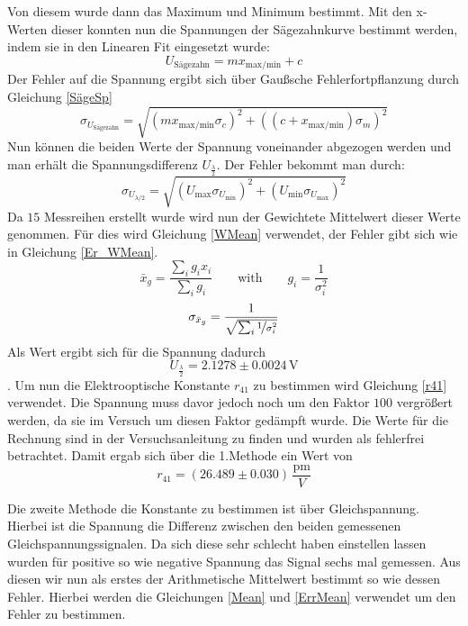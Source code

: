 Von diesem wurde dann das Maximum und Minimum bestimmt. Mit den x-Werten dieser konnten nun die Spannungen der Sägezahnkurve bestimmt werden, indem sie in den Linearen Fit eingesetzt wurde:
\begin{equation}
	U_\text{Sägezahn}= mx_{\text{max/min}} + c
\end{equation}
Der Fehler auf die Spannung ergibt sich über Gaußsche Fehlerfortpflanzung durch Gleichung \ref{SägeSp}
\begin{equation}
	\sigma_{U_\text{Sägezahn}}=\sqrt{\left(mx_{\text{max/min}}\sigma_c\right)^2+\left((c + x_{\text{max/min}})\sigma_m\right)^2}
	\label{SägeSp}
\end{equation}
Nun können die beiden Werte der Spannung voneinander abgezogen werden und man erhält die Spannungsdifferenz $U_{\frac{\lambda}{2}}$. Der Fehler bekommt man durch:
\begin{equation}
	\sigma_{U_{\lambda/2}}=\sqrt{\left(U_\text{max}\sigma_{U_{\text{min}}}\right)^2+\left(U_{\text{min}}\sigma_{U_{\text{max}}}\right)^2}
	\label{Errdif}
\end{equation}
Da $15$ Messreihen erstellt wurde wird nun der Gewichtete Mittelwert dieser Werte genommen. Für dies wird Gleichung \ref{WMean} verwendet, der Fehler gibt sich wie in Gleichung \ref{Er_WMean}.
\begin{equation}
\bar{x}_g=\frac{\sum_ig_ix_i}{\sum_ig_i} \qquad \text{with} \qquad g_i=\frac{1}{\sigma_i^2}
\label{WMean}
\end{equation}
\begin{equation}
\sigma_{\bar{x}_g}=\frac{1}{\sqrt{\sum_i\nicefrac{1}{\sigma_i^2}}}
\label{Er_WMean}
\end{equation}
Als Wert ergibt sich für die Spannung dadurch $$U_{\frac{\lambda}{2}}=2.1278\pm0.0024\,\text{V}$$. Um nun die Elektrooptische Konstante $r_{41}$ zu bestimmen wird Gleichung \ref{r41} verwendet. Die Spannung muss davor jedoch noch um den Faktor $100$ vergrößert werden, da sie im Versuch um diesen Faktor gedämpft wurde. Die Werte für die Rechnung sind in der Versuchsanleitung \cite{anleitung} zu finden und wurden als fehlerfrei betrachtet. Damit ergab sich über die 1.Methode ein Wert von $$r_{41}=(26.489\pm0.030)\,\frac{\text{pm}}{V}$$\par
Die zweite Methode die Konstante zu bestimmen ist über Gleichspannung. Hierbei ist die Spannung die Differenz zwischen den beiden gemessenen Gleichspannungssignalen. Da sich diese sehr schlecht haben einstellen lassen wurden für positive so wie negative Spannung das Signal sechs mal gemessen. Aus diesen wir nun als erstes der Arithmetische Mittelwert bestimmt so wie dessen Fehler. Hierbei werden die Gleichungen \ref{Mean} und \ref{ErrMean} verwendet um den Fehler zu bestimmen.
